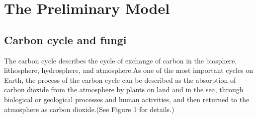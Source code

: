 \documentclass[12pt]{article}
\begin{document}
	
	
	\section{The Preliminary Model}
	\subsection{Carbon cycle and fungi}
	The carbon cycle describes the cycle of exchange of carbon in the biosphere, lithosphere, hydrosphere, and atmosphere.As one of the most important cycles on Earth, the process of the carbon cycle can be described as the absorption of carbon dioxide from the atmosphere by plants on land and in the sea, through biological or geological processes and human activities, and then returned to the atmosphere as carbon dioxide.(See Figure 1 for details.)\par
	
\end{document}
